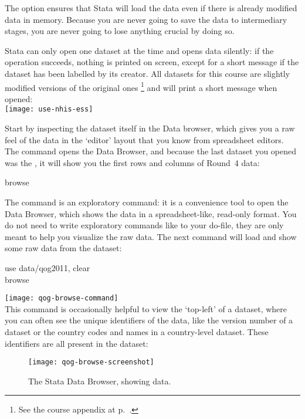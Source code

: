 	The  option ensures that Stata will load the data even if there is already modified data in memory. Because you are never going to save the data to intermediary stages, you are never going to lose anything crucial by doing so.%

	Stata can only open one dataset at the time and opens data silently: if the operation succeeds, nothing is printed on screen, except for a short message if the dataset has been labelled by its creator. All datasets for this course are slightly modified versions of the original ones%
		\footnote{See the course appendix at p.~\pageref{sec:data-sources}.} %
		and will print a short message when opened:\\[1em]

		\texttt{[image: use-nhis-ess]}

	 Start by inspecting the dataset itself in the Data browser, which gives you a raw feel of the data in the `editor' layout that you know from spreadsheet editors. The  command opens the Data Browser, and because the last dataset you opened was the \ess, it will show you the first rows and columns of \ESS Round~4 data:%

		\begin{docspec}
			browse
		\end{docspec}

	The  command is an exploratory command: it is a convenience tool to open the Data Browser, which shows the data in a spreadsheet-like, read-only format. You do not need to write exploratory commands like  to your do-file, they are only meant to help you visualize the raw data. The next command will load and show some raw data from the \qog dataset:\\[1em]%

		\begin{docspec}
			use data/qog2011, clear\\
			browse
		\end{docspec}
	
		\texttt{[image: qog-browse-command]}\\[1em]

	This command is occasionally helpful to view the `top-left' of a dataset, where you can often see the unique identifiers of the data, like the version number of a dataset or the country codes and names in a country-level dataset. These identifiers are all present in the \QOG dataset:%

		\begin{figure*}[h]
			\texttt{[image: qog-browse-screenshot]}%
		  \caption{The Stata Data Browser, showing \QOG data.}%
		  \label{fig:qog-browse}%
		\end{figure*}


